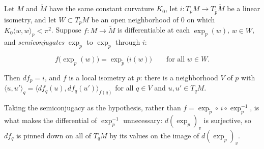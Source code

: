 \begin{lemma}
  \label{lem:dc-ch8-2-2-semiconjugacy}


  Let $M$ and $\tilde M$ have the same constant curvature $K_0$, let $i:T_pM\to T_{\tilde p}\tilde M$
  be a linear isometry, and let $W\subset T_pM$ be an open neighborhood of $0$ on which
  $K_0\langle w,w\rangle_p<\pi^2$. Suppose $f:M\to\tilde M$ is differentiable at each $\exp_p(w)$,
  $w\in W$, and \emph{semiconjugates} $\exp_p$ to $\exp_{\tilde p}$ through $i$:

  $$
  f\big(\exp_p(w)\big)=\exp_{\tilde p}\big(i(w)\big)\qquad\text{for all }w\in W .
  $$

  Then $df_p=i$, and $f$ is a local isometry at $p$: there is a neighborhood $V$ of $p$ with
  $\langle u,u'\rangle_q=\langle df_q(u),df_q(u')\rangle_{f(q)}$ for all $q\in V$ and
  $u,u'\in T_qM$.

  Taking the semiconjugacy as the hypothesis, rather than $f=\exp_{\tilde p}\circ\,i\circ\exp_p^{-1}$,
  is what makes the differential of $\exp_p^{-1}$ unnecessary: $d(\exp_p)_v$ is surjective, so $df_q$
  is pinned down on all of $T_qM$ by its values on the image of $d(\exp_p)_v$.
\end{lemma}
